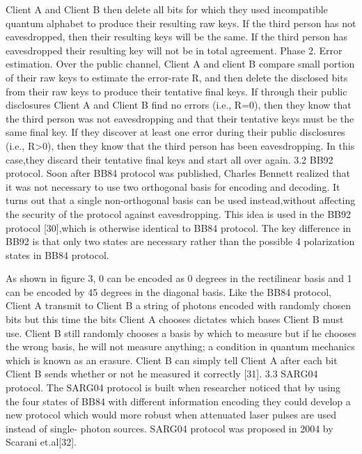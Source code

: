 Client A and Client B then delete all bits for which they used incompatible quantum alphabet to produce their resulting raw keys. If the third person has not eavesdropped, then their resulting keys will be the same. If the third person has eavesdropped their resulting key will not be in total agreement.
Phase 2. Error estimation. Over the public channel, Client A and client B compare small portion of their raw keys to estimate the error-rate R, and then delete the disclosed bits from their raw keys to produce their tentative final keys. If through their public disclosures Client A and Client B find no errors (i.e., R=0), then they know that the third person was not eavesdropping and that their tentative keys must be the same final key. If they discover at least one error during their public disclosures (i.e., R>0), then they know that the third person has been eavesdropping. In this case,they discard their tentative final keys and start all over again.
3.2 BB92 protocol. Soon after BB84 protocol was published, Charles Bennett realized that it was not necessary to use two orthogonal basis for encoding and decoding. It turns out that a single non-orthogonal basis can be used instead,without affecting the security of the protocol against eavesdropping. This idea is used in the BB92 protocol [30],which is otherwise identical to BB84 protocol.
The key difference in BB92 is that only two states are necessary rather than the possible 4 polarization states in BB84 protocol.

As shown in figure 3, 0 can be encoded as 0 degrees in the rectilinear basis and 1 can be encoded by 45 degrees in the diagonal basis. Like the BB84 protocol, Client A transmit to Client B a string of photons encoded with randomly chosen bits but this time the bits Client A chooses dictates which bases Client B must use. Client B still randomly chooses a basis by which to measure but if he chooses the wrong basis, he will not measure anything; a condition in quantum mechanics which is known as an erasure. Client B can simply tell Client A after each bit Client B sends whether or not he measured it correctly [31].
3.3 SARG04 protocol. The SARG04 protocol is built when researcher noticed that by using the four states of BB84 with different information encoding they could develop a new protocol which would more robust when attenuated laser pulses are used instead of single- photon sources. SARG04 protocol was proposed in 2004 by Scarani et.al[32].


